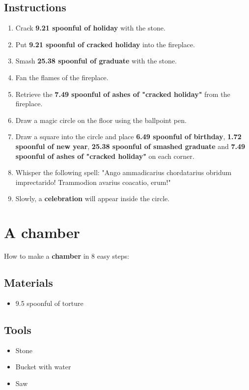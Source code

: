 \documentclass{article}
\begin{document}
\subsection{Instructions}\begin{enumerate}
\item 
Crack \textbf{9.21 spoonful of holiday} with the stone.
\item 
Put \textbf{9.21 spoonful of cracked holiday} into the fireplace.
\item 
Smash \textbf{25.38 spoonful of graduate} with the stone.
\item 
Fan the flames of the fireplace.
\item 
Retrieve the \textbf{7.49 spoonful of ashes of "cracked holiday"} from the fireplace.
\item 
Draw a magic circle on the floor using the ballpoint pen.
\item 
Draw a square into the circle and place \textbf{6.49 spoonful of birthday}, \textbf{1.72 spoonful of new year}, \textbf{25.38 spoonful of smashed graduate} and \textbf{7.49 spoonful of ashes of "cracked holiday"} on each corner.
\item 
Whisper the following spell: "Ango ammadicarius chordatarius obridum imprectarido! Trammodion avarius coacatio, erum!"
\item 
Slowly, a \textbf{celebration} will appear inside the circle.
\end{enumerate}
\newpage
\section{A chamber}How to make a \textbf{chamber} in 8 easy steps:

\subsection{Materials}\begin{itemize}
\item 
9.5 spoonful of torture
\end{itemize}
\subsection{Tools}\begin{itemize}
\item 
Stone
\item 
Bucket with water
\item 
Saw
\end{itemize}
\end{document}
